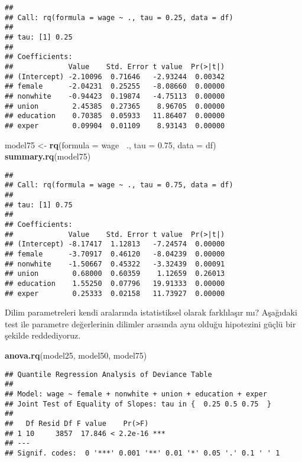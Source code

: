 \documentclass[
]{book}
\newenvironment{Shaded}{\begin{snugshade}}{\end{snugshade}}
\newcommand{\DataTypeTok}[1]{\textcolor[rgb]{0.13,0.29,0.53}{#1}}
\newcommand{\FloatTok}[1]{\textcolor[rgb]{0.00,0.00,0.81}{#1}}
\newcommand{\KeywordTok}[1]{\textcolor[rgb]{0.13,0.29,0.53}{\textbf{#1}}}
\newcommand{\NormalTok}[1]{#1}
\newcommand{\OperatorTok}[1]{\textcolor[rgb]{0.81,0.36,0.00}{\textbf{#1}}}
\newcommand{\StringTok}[1]{\textcolor[rgb]{0.31,0.60,0.02}{#1}}
\begin{document}
\begin{verbatim}
## 
## Call: rq(formula = wage ~ ., tau = 0.25, data = df)
## 
## tau: [1] 0.25
## 
## Coefficients:
##             Value    Std. Error t value  Pr(>|t|)
## (Intercept) -2.10096  0.71646   -2.93244  0.00342
## female      -2.04231  0.25255   -8.08660  0.00000
## nonwhite    -0.94423  0.19874   -4.75113  0.00000
## union        2.45385  0.27365    8.96705  0.00000
## education    0.70385  0.05933   11.86407  0.00000
## exper        0.09904  0.01109    8.93143  0.00000
\end{verbatim}

\begin{Shaded}
\begin{Highlighting}[]
\NormalTok{model75 <-}\StringTok{ }\KeywordTok{rq}\NormalTok{(}\DataTypeTok{formula =}\NormalTok{ wage }\OperatorTok{~}\NormalTok{., }\DataTypeTok{tau =} \FloatTok{0.75}\NormalTok{, }\DataTypeTok{data =}\NormalTok{ df)}
\KeywordTok{summary.rq}\NormalTok{(model75)}
\end{Highlighting}
\end{Shaded}

\begin{verbatim}
## 
## Call: rq(formula = wage ~ ., tau = 0.75, data = df)
## 
## tau: [1] 0.75
## 
## Coefficients:
##             Value    Std. Error t value  Pr(>|t|)
## (Intercept) -8.17417  1.12813   -7.24574  0.00000
## female      -3.70917  0.46120   -8.04239  0.00000
## nonwhite    -1.50667  0.45322   -3.32439  0.00091
## union        0.68000  0.60359    1.12659  0.26013
## education    1.55250  0.07796   19.91333  0.00000
## exper        0.25333  0.02158   11.73927  0.00000
\end{verbatim}

Dilim parametreleri kendi aralarında istatistiksel olarak farklılaşır mı? Aşağıdaki test ile parametre değerlerinin dilimler arasında aynı olduğu hipotezini güçlü bir şekilde reddediyoruz.

\begin{Shaded}
\begin{Highlighting}[]
\KeywordTok{anova.rq}\NormalTok{(model25, model50, model75)}
\end{Highlighting}
\end{Shaded}

\begin{verbatim}
## Quantile Regression Analysis of Deviance Table
## 
## Model: wage ~ female + nonwhite + union + education + exper
## Joint Test of Equality of Slopes: tau in {  0.25 0.5 0.75  }
## 
##   Df Resid Df F value    Pr(>F)    
## 1 10     3857  17.846 < 2.2e-16 ***
## ---
## Signif. codes:  0 '***' 0.001 '**' 0.01 '*' 0.05 '.' 0.1 ' ' 1
\end{verbatim}
\end{document}
